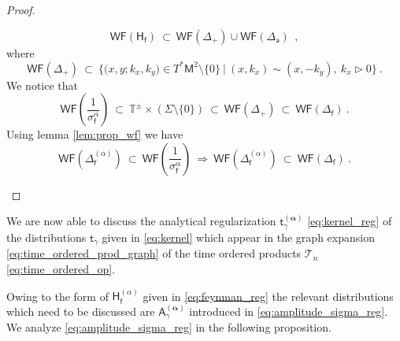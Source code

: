 \documentclass[11pt]{book}
\newcommand{\WF}{\mathsf{WF}}
\newcommand{\alphabd}{\boldsymbol{\alpha}}
\newcommand{\Tcal}{\mathcal{T}}
\newcommand{\Tbb}{\mathbb{T}}
\newcommand{\Asf}{\mathsf{A}}
\newcommand{\Hsf}{\mathsf{H}}
\newcommand{\Msf}{\mathsf{M}}
\newcommand{\asf}{\mathsf{a}}
\newcommand{\fsf}{\mathsf{f}}
\newcommand{\tsf}{\mathsf{t}}
\theoremstyle{break}
\begin{document}
\begin{proof}
\begin{description}
\begin{equation*}
\WF(\Hsf_\fsf) \ \subset \ \WF(\Delta_+) \cup \WF(\Delta_\asf) \ \ , 
\end{equation*}
%
where
%
\begin{equation*}
\WF(\Delta_+) \ \subset \ \bigg\{ \bigg( x, y ; k_x, k_y \bigg) \in T^\ast\Msf^2 \setminus \{0\} \ \bigg| \ (x,k_x) \sim (x,-k_y), \ k_x \triangleright 0 \bigg\} \ .
\end{equation*}
% 
We notice that 
%
\begin{equation*}
\WF\left(\frac{1}{\sigma_\fsf^\alpha}\right) 
\ \subset \ 
\Tbb^\pm \times \left( \Sigma \setminus \{0\} \right) 
\ \subset \
\WF(\Delta_+)
\ \subset \
\WF(\Delta_\fsf) \ .
\end{equation*}
%
Using lemma \ref{lem:prop_wf} we have
%
\begin{equation*}
\WF(\Delta_\fsf^{(\alpha)}) 
\ \subset \ 
\WF\left(\frac{1}{\sigma_\fsf^\alpha}\right)
\ \Longrightarrow \
\WF(\Delta_\fsf^{(\alpha)}) 
\ \subset \ 
\WF(\Delta_\fsf) \ .
\end{equation*}
%
\end{description}
\end{proof}


We are now able to discuss the analytical regularization $\tsf^{(\alphabd)}_\gamma$ \eqref{eq:kernel_reg} of the distributions $\tsf_\gamma$ given in \eqref{eq:kernel} which appear in the graph expansion \eqref{eq:time_ordered_prod_graph} of the time ordered products $\Tcal_n$ \eqref{eq:time_ordered_op}. 


Owing to the form of $\Hsf^{(\alpha)}_\fsf$ given in \eqref{eq:feynman_reg} the relevant distributions which need to be discussed are $\Asf^{(\alphabd)}_\gamma$ introduced in \eqref{eq:amplitude_sigma_reg}. We analyze \eqref{eq:amplitude_sigma_reg} in the following proposition.
\end{document}
